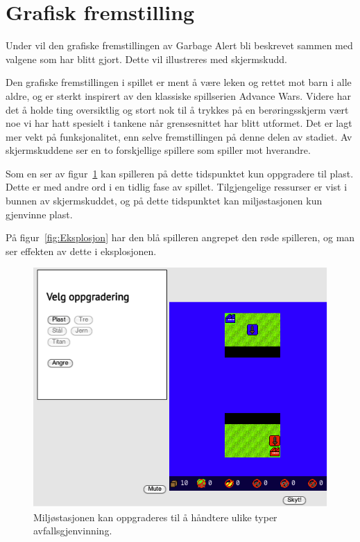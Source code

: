 \section{Grafisk fremstilling}\label{sec:artwork}
Under vil den grafiske fremstillingen av Garbage Alert bli beskrevet
sammen med valgene som har blitt gjort. Dette vil illustreres med
skjermskudd.

Den grafiske fremstillingen i spillet er ment å være leken og rettet mot
barn i alle aldre, og er sterkt inspirert av den klassiske spillserien
Advance Wars. Videre har det å holde ting oversiktlig og stort nok til å
trykkes på en berøringsskjerm vært noe vi har hatt spesielt i tankene
når grensesnittet har blitt utformet. Det er lagt mer vekt på
funksjonalitet, enn selve fremstillingen på denne delen av stadiet. Av
skjermskuddene ser en to forskjellige spillere som spiller mot
hverandre.

Som en ser av figur~\ref{fig:Oppgradering} kan spilleren på dette
tidspunktet kun oppgradere til plast. Dette er med andre ord i en tidlig
fase av spillet. Tilgjengelige ressurser er vist i bunnen av
skjermskuddet, og på dette tidspunktet kan miljøstasjonen kun gjenvinne
plast.

På figur~\ref{fig:Eksplosjon} har den blå spilleren angrepet den røde
spilleren, og man ser effekten av dette i eksplosjonen.

\begin{figure} [H]
\centering
\includegraphics[width=\textwidth]{images/Oppgradering.png}
\caption{Miljøstasjonen kan oppgraderes til å håndtere ulike typer avfallsgjenvinning.}
\label{fig:Oppgradering}
\end{figure}

